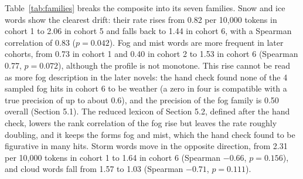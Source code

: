 \documentclass[11pt]{article}
\begin{document}
Table~\ref{tab:families} breaks the composite into its seven families. Snow and ice words show the clearest drift: their rate rises from 0.82 per 10,000 tokens in cohort 1 to 2.06 in cohort 5 and falls back to 1.44 in cohort 6, with a Spearman correlation of 0.83 ($p=0.042$).
Fog and mist words are more frequent in later cohorts, from 0.73 in cohort 1 and 0.40 in cohort 2 to 1.53 in cohort 6 (Spearman 0.77, $p=0.072$), although the profile is not monotone.
This rise cannot be read as more fog description in the later novels: the hand check found none of the 4 sampled fog hits in cohort 6 to be weather (a zero in four is compatible with a true precision of up to about 0.6), and the precision of the fog family is 0.50 overall (Section 5.1).
The reduced lexicon of Section 5.2, defined after the hand check, lowers the rank correlation of the fog rise but leaves the rate roughly doubling, and it keeps the forms fog and mist, which the hand check found to be figurative in many hits.
Storm words move in the opposite direction, from 2.31 per 10,000 tokens in cohort 1 to 1.64 in cohort 6 (Spearman $-0.66$, $p=0.156$), and cloud words fall from 1.57 to 1.03 (Spearman $-0.71$, $p=0.111$).
\end{document}
